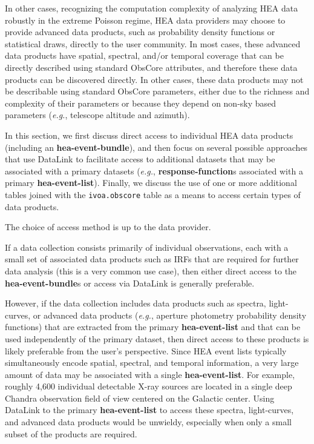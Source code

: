 In other cases, recognizing the computation complexity of analyzing \gls{HEA} data robustly in the extreme Poisson regime, \gls{HEA} data providers may choose to provide advanced data products, such as probability density functions or statistical draws, directly to the user community.  In most cases, these advanced data products have spatial, spectral, and/or temporal coverage that can be directly described using standard ObsCore attributes, and therefore these data products can be discovered directly.  In other cases, these data products may not be describable using standard ObsCore parameters, either due to the richness and complexity of their parameters or because they depend on non-sky based parameters ({\em e.g.\/}, telescope altitude and azimuth).

In this section, we first discuss direct access to individual \gls{HEA} data products (including an {\bf hea-event-bundle}), and then focus on several possible approaches that use DataLink \citep{2023ivoa.spec.1215B} to facilitate access to additional datasets that may be associated with a primary datasets ({\em e.g.\/}, {\bf response-function}s associated with a primary {\bf hea-event-list}). Finally, we discuss the use of one or more additional tables joined with the {\tt ivoa.obscore} table as a means to access certain types of data products.

The choice of access method is up to the data provider.

If a data collection consists primarily of individual observations, each with a small set of associated data products such as \glspl{IRF} that are required for further data analysis (this is a very common use case), then either direct access to the {\bf hea-event-bundle}s or access via DataLink is generally preferable.

However, if the data collection includes data products such as spectra, light-curves, or advanced data products ({\em e.g.\/}, aperture photometry probability density functions) that are extracted from the primary {\bf hea-event-list} and that can be used independently of the primary dataset, then direct access to these products is likely preferable from the user's perspective.  Since \gls{HEA} event lists typically simultaneously encode spatial, spectral, and temporal information, a very large amount of data may be associated with a single {\bf hea-event-list}.  For example, roughly 4,600 individual detectable X-ray sources are located in a single deep Chandra observation field of view centered on the Galactic center.  Using DataLink to the primary {\bf hea-event-list} to access these spectra, light-curves, and advanced data products would be unwieldy, especially when only a small subset of the products are required.

